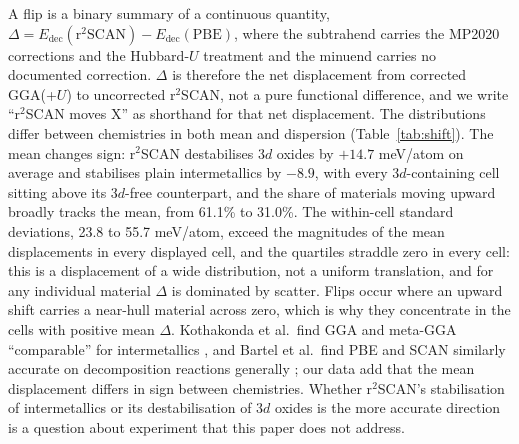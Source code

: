 \documentclass[11pt]{article}
\begin{document}
A flip is a binary summary of a continuous quantity,
$\Delta = E_{\text{dec}}(\text{r}^2\text{SCAN}) - E_{\text{dec}}(\text{PBE})$, where the
subtrahend carries the MP2020 corrections and the Hubbard-$U$ treatment and the minuend
carries no documented correction. $\Delta$ is therefore the net displacement from corrected GGA(+$U$) to uncorrected
r$^2$SCAN, not a pure functional difference, and we write ``r$^2$SCAN moves X'' as
shorthand for that net displacement. The distributions differ between chemistries in
both mean and dispersion (Table~\ref{tab:shift}). The mean changes sign: r$^2$SCAN
destabilises 3$d$ oxides by $+14.7$ meV/atom on average and stabilises plain
intermetallics by $-8.9$, with every 3$d$-containing cell sitting above its 3$d$-free
counterpart, and the share of materials moving upward broadly tracks the mean, from 61.1\% to
31.0\%. The within-cell standard deviations, 23.8 to 55.7 meV/atom, exceed the magnitudes of
the mean displacements in every displayed cell, and the quartiles straddle zero in every
cell: this is
a displacement of a wide distribution, not a uniform translation, and for any individual
material $\Delta$ is dominated by scatter. Flips occur where an upward shift carries a
near-hull material across zero, which is why they concentrate in the cells with positive
mean $\Delta$. Kothakonda et al.\ find GGA and meta-GGA ``comparable'' for intermetallics
\citep{kothakonda2023}, and Bartel et al.\ find PBE and SCAN similarly accurate on
decomposition reactions generally \citep{bartel2019}; our data add that
the mean displacement differs in sign between chemistries. Whether r$^2$SCAN's
stabilisation of intermetallics or its destabilisation of 3$d$ oxides is the more
accurate direction is a question about experiment that this paper does not address.
\end{document}
